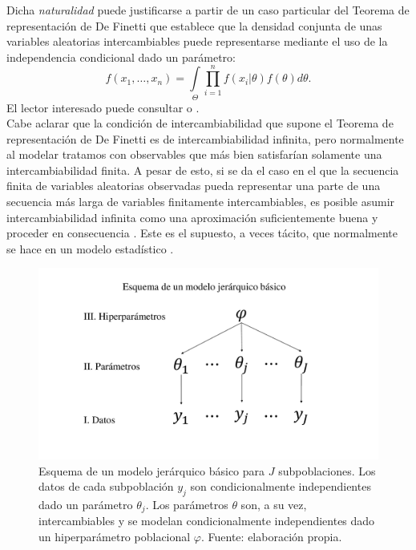 Dicha \textit{naturalidad} puede justificarse a partir de un caso particular del Teorema de representación de De Finetti que establece que la densidad conjunta de unas variables aleatorias intercambiables puede representarse mediante el uso de la independencia condicional dado un parámetro: 
\begin{equation*}
f(x_1,\dots,x_n) = \int\limits_\Theta \prod\limits_{i=1}^n f(x_i|\theta)f(\theta)d\theta.
\end{equation*} 
El lector interesado puede consultar \textcite{GP98} o \textcite{BernardoSmith00}.\\ 

Cabe aclarar que la condición de intercambiabilidad que supone el Teorema de representación de De Finetti es de intercambiabilidad infinita, pero normalmente al modelar tratamos con observables que más bien satisfarían solamente una intercambiabilidad finita. A pesar de esto, si se da el caso en el que la secuencia finita de variables aleatorias observadas pueda representar una parte de una secuencia más larga de variables finitamente intercambiables, es posible asumir intercambiabilidad infinita como una aproximación suficientemente buena y proceder en consecuencia \parencite{BernardoSmith00}. Este es el supuesto, a veces tácito, que normalmente se hace en un modelo estadístico \parencite{Gelman13}.\\

\begin{figure}[h]
	\centering
	\includegraphics[scale=0.25]{Figs/Bayes/Modelo_Jer}
	\caption{Esquema de un modelo jerárquico básico para $J$ subpoblaciones. Los datos de cada subpoblación $y_j$ son condicionalmente independientes dado un parámetro $\theta_j$. Los parámetros $\theta$ son, a su vez, intercambiables y se modelan condicionalmente independientes dado un hiperparámetro poblacional $\varphi$. Fuente: elaboración propia.}
	\label{fig:Esquema_Modelo_Jer}	
\end{figure}

